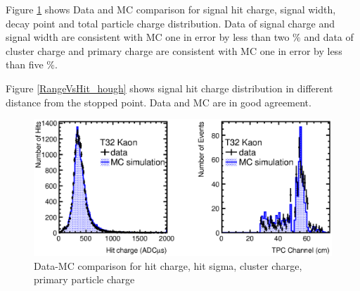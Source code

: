 Figure \ref{KsomeQuantities} shows Data and MC comparison for signal hit charge, signal width, decay point and total particle charge distribution.
Data of signal charge and signal width are consistent with MC one in error by less than two $\%$ and data of cluster charge and primary charge are consistent with  
MC one in error by less than five $\%$.

Figure \ref{RangeVsHit_hough} shows signal hit charge distribution in different distance from the stopped point.
Data and MC are in good agreement.

\begin{figure}[htbp]
  \begin{center}
    \includegraphics[width=1.0\hsize]{fig/Kaon1.eps}
  \end{center}    
    \caption{Data-MC comparison for hit charge, hit sigma, cluster charge, primary particle charge}
    \label{KsomeQuantities}
\end{figure}


